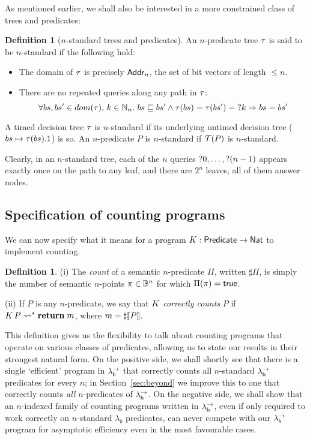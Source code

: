 \documentclass[12pt,phd,lfcs,twoside,openright,logo,leftchapter,normalheadings]{infthesis}
\theoremstyle{plain}
\theoremstyle{definition}
\newtheorem{definition}[theorem]{Definition}
\begin{document}
As mentioned earlier, we shall also be interested in a more constrained
class of trees and predicates:

\begin{definition}[$n$-standard trees and predicates]
An $n$-predicate tree $\tau$ is said to be $n$-standard if the following hold:
\begin{itemize}
\item The domain of $\tau$ is precisely $\mathsf{Addr}_n$, the set of bit vectors of length $\leq n$.
\item There are no repeated queries along any path in $\tau$:
  \[ \forall bs, bs' \in dom(\tau),\, k \in \mathbb{N}_n.~ bs \sqsubseteq bs' \wedge \tau(bs)=\tau(bs')=\mathord{?} k \Rightarrow bs=bs' \]
\end{itemize}
A timed decision tree $\tau$ is $n$-standard if its underlying untimed
decision tree ($bs \mapsto \tau(bs).1$) is so.
An $n$-predicate $P$ is $n$-standard if $\mathcal{T}(P)$ is $n$-standard.
\end{definition}

Clearly, in an $n$-standard tree, each of the $n$ queries
$\mathord{?} 0,\dots, \mathord{?}(n-1)$ appears exactly once on the path to any
leaf, and there are $2^n$ leaves, all of them answer nodes.

\subsection{Specification of counting programs}
\label{sec:counting}

We can now specify what it means for a program
$K : \mathsf{Predicate} \to \mathsf{Nat}$ to implement counting.

\begin{definition} \label{def:counting-function}
(i) The \emph{count} of a semantic $n$-predicate $\Pi$, written $\sharp \Pi$,
is simply the number of semantic $n$-points $\pi \in \mathbb{B}^n$ for which $\Pi(\pi)=\mathsf{true}$.

(ii) If $P$ is any $n$-predicate, we say that $K$ \emph{correctly counts} $P$ if
$K\,P \leadsto^\ast \mathbf{return}\;m$, where $m = \sharp \val{P}$.
\end{definition}

This definition gives us the flexibility to talk about counting
programs that operate on various classes of predicates, allowing us to
state our results in their strongest natural form. On the positive
side, we shall shortly see that there is a single `efficient' program
in $\lambda^\rightarrow_{\mathsf{h}}$ that correctly counts all $n$-standard $\lambda^\rightarrow_{\mathsf{h}}$
predicates for every $n$; in Section~\ref{sec:beyond} we improve this
to one that correctly counts \emph{all} $n$-predicates of $\lambda^\rightarrow_{\mathsf{h}}$.
On the negative side, we shall show that an $n$-indexed family of
counting programs written in $\lambda^\rightarrow_{\mathsf{b}}$, even if only required to work
correctly on $n$-standard $\lambda_b$ predicates, can never compete
with our $\lambda^\rightarrow_{\mathsf{h}}$ program for asymptotic efficiency even in the most
favourable cases.
\end{document}

